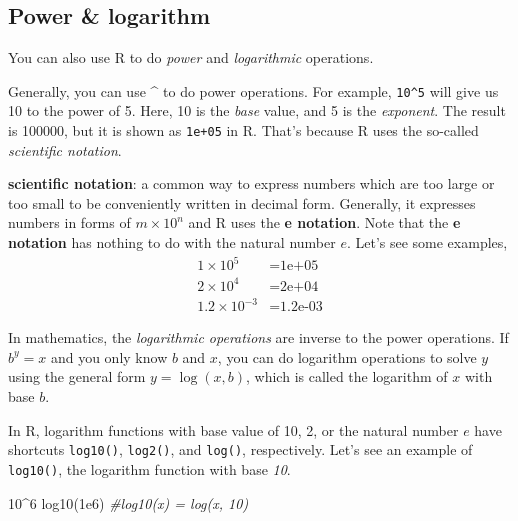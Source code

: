 \documentclass[
]{book}
\newenvironment{Shaded}{\begin{snugshade}}{\end{snugshade}}
\newcommand{\CommentTok}[1]{\textcolor[rgb]{0.56,0.35,0.01}{\textit{#1}}}
\newcommand{\DecValTok}[1]{\textcolor[rgb]{0.00,0.00,0.81}{#1}}
\newcommand{\FloatTok}[1]{\textcolor[rgb]{0.00,0.00,0.81}{#1}}
\newcommand{\FunctionTok}[1]{\textcolor[rgb]{0.00,0.00,0.00}{#1}}
\newcommand{\NormalTok}[1]{#1}
\newcommand{\SpecialCharTok}[1]{\textcolor[rgb]{0.00,0.00,0.00}{#1}}
\newenvironment{blackbox}{
  \definecolor{shadecolor}{rgb}{0, 0, 0}  %
  \color{white}
  \begin{shaded}}
 {\end{shaded}}
\newenvironment{infobox}[1]
  {
  \begin{itemize}
  \renewcommand{\labelitemi}{
    \raisebox{-.7\height}[0pt][0pt]{
      {\setkeys{Gin}{width=3em,keepaspectratio}
        \texttt{[image: pics/\#1]}}
    }
  }
  \setlength{\fboxsep}{1em}
  \begin{blackbox}
  \item
  }
  {
  \end{blackbox}
  \end{itemize}
  }
\begin{document}
\hypertarget{power-logarithm}{%
\subsection{Power \& logarithm}\label{power-logarithm}}

You can also use R to do \emph{power} and \emph{logarithmic} operations.

Generally, you can use \textbf{\^{}} to do power operations. For example, \texttt{10\^{}5} will give us 10 to the power of 5. Here, 10 is the \emph{base} value, and 5 is the \emph{exponent}. The result is 100000, but it is shown as \texttt{1e+05} in R. That's because R uses the so-called \emph{scientific notation}.

\begin{infobox}{caution}
\textbf{scientific notation}: a common way to express numbers which are too large or too small to be conveniently written in decimal form. Generally, it expresses numbers in forms of \(m \times 10^n\) and R uses the \textbf{e notation}. Note that the \textbf{e notation} has nothing to do with the natural number \(e\). Let's see some examples,
\begin{align}
1 \times 10^5 &= \mbox{1e+05}\\
2 \times 10^4 &= \mbox{2e+04}\\
1.2 \times 10^{-3} &= \mbox{1.2e-03}
\end{align}

\end{infobox}

In mathematics, the \emph{logarithmic operations} are inverse to the power operations. If \textbf{\(b^y = x\)} and you only know \emph{\(b\)} and \emph{\(x\)}, you can do logarithm operations to solve \emph{\(y\)} using the general form \textbf{\(y = \log(x, b)\)}, which is called the logarithm of \(x\) with base \(b\).

In R, logarithm functions with base value of 10, 2, or the natural number \(e\) have shortcuts \texttt{log10()}, \texttt{log2()}, and \texttt{log()}, respectively. Let's see an example of \texttt{log10()}, the logarithm function with base \emph{10}.

\begin{Shaded}
\begin{Highlighting}[]
\DecValTok{10}\SpecialCharTok{\^{}}\DecValTok{6} 
\FunctionTok{log10}\NormalTok{(}\FloatTok{1e6}\NormalTok{) }\CommentTok{\#log10(x) = log(x, 10)}
\end{Highlighting}
\end{Shaded}
\end{document}
